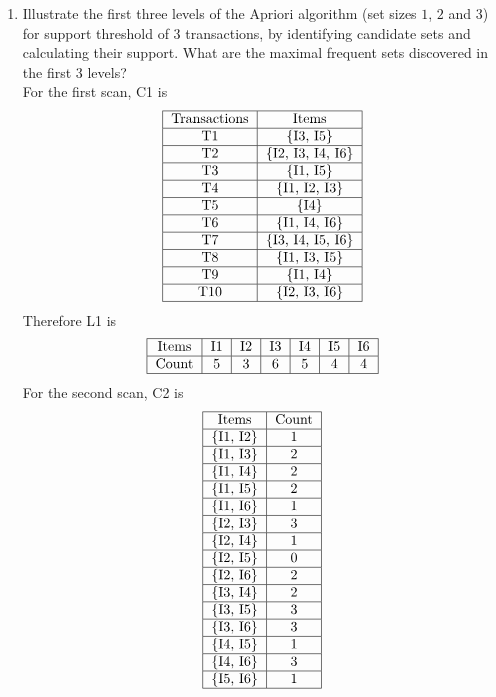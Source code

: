 \documentclass[12pt]{article}
\begin{document}
\begin{enumerate} 
\item Illustrate the first three levels of the Apriori algorithm (set sizes $1$, $2$ and $3$) for support threshold of $3$ transactions, by identifying candidate sets and calculating their support. What are the maximal frequent sets discovered in the first $3$ levels? \\
For the first scan, C1 is $$ \begin{tabular}{|c|c|} \hline 
Transactions & Items \\ \hline 
T1 & \{I3, I5\} \\ \hline T2 & \{I2, I3, I4, I6\} \\ \hline
T3 & \{I1, I5\} \\ \hline T4 & \{I1, I2, I3\} \\ \hline 
T5 & \{I4\} \\ \hline T6 & \{I1, I4, I6\} \\ \hline 
T7 & \{I3, I4, I5, I6\} \\ \hline T8 & \{I1, I3, I5\} \\ \hline 
T9 & \{I1, I4\} \\ \hline T10 & \{I2, I3, I6\} \\ \hline \end{tabular} $$ 
Therefore L1 is $$ \begin{tabular}{|c|c|c|c|c|c|c|} \hline 
Items & I1 & I2 & I3 & I4 & I5 & I6 \\ \hline 
Count & 5 & 3 & 6 & 5 & 4 & 4 \\ \hline \end{tabular} $$ 
For the second scan, C2 is $$ \begin{tabular}{|c|c|} \hline 
Items & Count \\ \hline 
\{I1, I2\} & 1 \\ \hline \{I1, I3\} & 2 \\ \hline \{I1, I4\} & 2 \\ \hline \{I1, I5\} & 2 \\ \hline \{I1, I6\} & 1 \\ \hline \{I2, I3\} & 3 \\ \hline \{I2, I4\} & 1 \\ \hline \{I2, I5\} & 0 \\ \hline \{I2, I6\} & 2 \\ \hline \{I3, I4\} & 2 \\ \hline \{I3, I5\} & 3 \\ \hline \{I3, I6\} & 3 \\ \hline \{I4, I5\} & 1 \\ \hline \{I4, I6\} & 3 \\ \hline \{I5, I6\} & 1 \\ \hline \end{tabular} $$ 

\end{enumerate}
\end{document}

